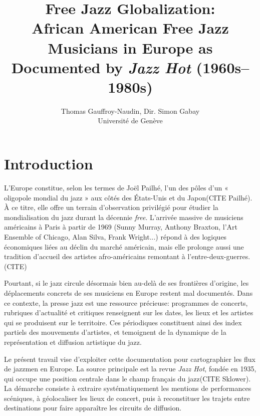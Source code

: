 \documentclass[11pt,french,hyphens]{article}
\title{\textbf{Free Jazz Globalization: \\ African American Free Jazz Musicians in Europe as Documented by \textit{Jazz Hot} (1960s--1980s)}}
\author{
  Thomas Gauffroy-Naudin, Dir. Simon Gabay \\
  Universit\'e de Gen\`eve \\
}
\date{}
\begin{document}
\maketitle

\section{Introduction}
L'Europe constitue, selon les termes de Joël Pailhé, l'un des pôles d'un « oligopole mondial du jazz » aux côtés des États-Unis et du Japon(CITE Pailhé). À ce titre, elle offre un terrain d'observation privilégié pour étudier la mondialisation du jazz durant la décennie \textit{free}. L'arrivée massive de musiciens américains à Paris à partir de 1969 (Sunny Murray, Anthony Braxton, l'Art Ensemble of Chicago, Alan Silva, Frank Wright...) répond à des logiques économiques liées au déclin du marché américain, mais elle prolonge aussi une tradition d'accueil des artistes afro-américains remontant à l'entre-deux-guerres. (CITE)

Pourtant, si le jazz circule désormais bien au-delà de ses frontières d'origine, les déplacements concrets de ses musiciens en Europe restent mal documentés. Dans ce contexte, la presse jazz est une ressource précieuse: programmes de concerts, rubriques d'actualité et critiques renseignent sur les dates, les lieux et les artistes qui se produisent sur le territoire. Ces périodiques constituent ainsi des index partiels des mouvements d'artistes, et temoignent de la dynamique de la représentation et diffusion artistique du jazz. 

Le présent travail vise d'exploiter cette documentation pour cartographier les flux de jazzmen en Europe. La source principale est la revue \textit{Jazz Hot}, fondée en 1935, qui occupe une position centrale dans le champ français du jazz(CITE Sklower). La démarche consiste à extraire systématiquement les mentions de performances scéniques, à géolocaliser les lieux de concert, puis à reconstituer les trajets entre destinations pour faire apparaître les circuits de diffusion.
\end{document}
